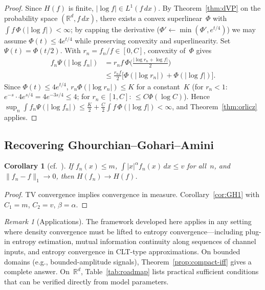 \documentclass[journal]{IEEEtran}
\newtheorem{corollary}[theorem]{Corollary}
\theoremstyle{definition}
\theoremstyle{remark}
\newtheorem{remark}[theorem]{Remark}
\newcommand{\Rd}{\mathbb{R}^d}
\newcommand{\1}{\mathbf{1}}
\newcommand{\Hent}{H}
\newcommand{\abs}[1]{\lvert #1 \rvert}
\newcommand{\norm}[1]{\lVert #1 \rVert}
\newcommand{\dx}{\,dx}
\begin{document}
\begin{proof}
Since $\Hent(f)$ is finite, $\abs{\log f} \in L^1(f\dx)$.
By Theorem~\ref{thm:dVP} on the probability space $(\Rd, f\dx)$,
there exists a convex superlinear~$\Phi$ with
$\int f\, \Phi(\abs{\log f}) < \infty$;
by capping the derivative ($\Phi' \leftarrow \min(\Phi', e^{t/4})$)
we may assume $\Phi(t) \leq 4e^{t/4}$ while preserving convexity
and superlinearity.
Set $\Psi(t) = \Phi(t/2)$.
With $r_n = f_n/f \in [0, C]$, convexity of~$\Phi$ gives
\begin{align*}
  f_n \Psi(\abs{\log f_n})
  &= r_n f\, \Phi\!\bigl(\tfrac{\abs{\log r_n + \log f}}{2}\bigr) \\
  &\leq \tfrac{r_n f}{2}
    \bigl[\Phi(\abs{\log r_n}) + \Phi(\abs{\log f})\bigr].
\end{align*}
Since $\Phi(t) \leq 4 e^{t/4}$,
$r_n \Phi(\abs{\log r_n}) \leq K$ for a constant~$K$
(for $r_n < 1$: $e^{-s} \cdot 4 e^{s/4} = 4 e^{-3s/4} \leq 4$;
for $r_n \in [1,C]$: $\leq C\Phi(\log C)$).
Hence
$\sup_n \int f_n \Psi(\abs{\log f_n})
\leq \tfrac{K}{2} + \tfrac{C}{2} \int f\, \Phi(\abs{\log f})
< \infty$,
and Theorem~\ref{thm:orlicz} applies.
\end{proof}

\subsection{Recovering Ghourchian--Gohari--Amini}

\begin{corollary}[cf.\ {\cite[Theorem~1]{GhourchianGohariAmini2017}}]
  \label{cor:GGA}
If $f_n(x) \leq m$, $\int \abs{x}^\alpha f_n(x) \dx \leq v$ for
all~$n$, and $\norm{f_n - f}_1 \to 0$, then
$\Hent(f_n) \to \Hent(f)$.
\end{corollary}

\begin{proof}
TV convergence implies convergence in measure.
Corollary~\ref{cor:GH1} with $C_1 = m$, $C_2 = v$,
$\beta = \alpha$.
\end{proof}

\begin{remark}[Applications]\label{rem:applications}
The framework developed here applies in any setting where
density convergence must be lifted to entropy convergence---including
plug-in entropy estimation, mutual information continuity along
sequences of channel inputs, and entropy convergence in CLT-type
approximations.  On bounded domains (e.g., bounded-amplitude
signals), Theorem~\ref{prop:compact-iff} gives a complete answer.
On~$\Rd$, Table~\ref{tab:roadmap} lists practical sufficient
conditions that can be verified directly from model parameters.
\end{remark}
\end{document}

